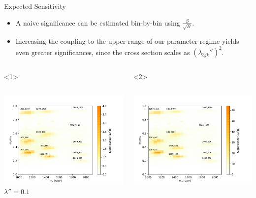 \documentclass[]{beamer}
\begin{document}
\begin{frame}{Expected Sensitivity}
  \begin{itemize}
  \item<1-> A naive significance can be estimated  bin-by-bin using $\frac{S}{\sqrt{B}}$.
  \item<2-> Increasing the coupling to the upper range of our parameter regime yields even greater significances, since the cross section scales as $\left(\lambda_{3 j k }''\right)^{2}$.
  \end{itemize}
  \begin{columns}
    \begin{onlyenv}<1>
      \begin{column}{0.5\textwidth}
        \begin{center}
          \includegraphics[width=\textwidth]{figures/SigPlotLPPFactor1.pdf} \\
          $\lambda'' = 0.1$
        \end{center}
      \end{column}
    \end{onlyenv}
    \begin{onlyenv}<2>
      \begin{column}{0.5\textwidth}
        \begin{center}
          \includegraphics[width=\textwidth]{figures/SigPlotLPPFactor16.pdf}\\

\end{center}
\end{column}
\end{onlyenv}
\end{columns}
\end{frame}
\end{document}
